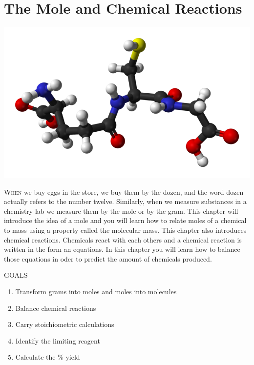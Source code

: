 \documentclass[main.tex]{subfiles}
\begin{document}
\linenumbers


\chapter[The Mole and Chemical Reactions ]{The Mole and Chemical Reactions}
\label{ch:mol}

\begin{marginfigure}
      \includegraphics{chapter7/figure1}
   \end{marginfigure}
\lettrine[lines=4]{\color{black!45}W}{hen} we buy eggs in the store, we buy them by the dozen, and the word dozen actually refers to the number twelve. Similarly, when we measure substances in a chemistry lab we measure them by the mole or by the gram. This chapter will introduce the idea of a mole and you will learn how to relate moles of a chemical to mass using a property called the molecular mass. This chapter also introduces chemical reactions. Chemicals react with each others and a chemical reaction is written in the form an equations. In this chapter you will learn how to balance those equations in oder to predict the amount of chemicals produced.
\begin{marginfigure}%
\begin{mytcbox}{GOALS}
\begin{enumerate}[label=\protect\circled{\color{white}\arabic*}]
\item Transform grams into moles and moles into molecules
\item Balance chemical reactions
\item Carry stoichiometric calculations
\item Identify the limiting reagent
\item Calculate the \% yield
\end{enumerate}
\end{mytcbox}
\end{marginfigure}%
\end{document}

